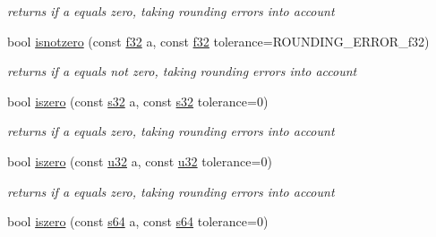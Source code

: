 \begin{DoxyCompactItemize}
\begin{DoxyCompactList}\small\item\em returns if a equals zero, taking rounding errors into account \end{DoxyCompactList}\item 
bool \hyperlink{namespaceirr_1_1core_a6e179d6dd92b81607f0539329dc2410a}{isnotzero} (const \hyperlink{namespaceirr_a0277be98d67dc26ff93b1a6a1d086b07}{f32} a, const \hyperlink{namespaceirr_a0277be98d67dc26ff93b1a6a1d086b07}{f32} tolerance=R\+O\+U\+N\+D\+I\+N\+G\+\_\+\+E\+R\+R\+O\+R\+\_\+f32)\hypertarget{namespaceirr_1_1core_a6e179d6dd92b81607f0539329dc2410a}{}\label{namespaceirr_1_1core_a6e179d6dd92b81607f0539329dc2410a}

\begin{DoxyCompactList}\small\item\em returns if a equals not zero, taking rounding errors into account \end{DoxyCompactList}\item 
bool \hyperlink{namespaceirr_1_1core_a3842b13dc7bd40f068cc8f7fd91bcfa5}{iszero} (const \hyperlink{namespaceirr_ac66849b7a6ed16e30ebede579f9b47c6}{s32} a, const \hyperlink{namespaceirr_ac66849b7a6ed16e30ebede579f9b47c6}{s32} tolerance=0)\hypertarget{namespaceirr_1_1core_a3842b13dc7bd40f068cc8f7fd91bcfa5}{}\label{namespaceirr_1_1core_a3842b13dc7bd40f068cc8f7fd91bcfa5}

\begin{DoxyCompactList}\small\item\em returns if a equals zero, taking rounding errors into account \end{DoxyCompactList}\item 
bool \hyperlink{namespaceirr_1_1core_afa64d4495f986ec0fa840e61cba45c68}{iszero} (const \hyperlink{namespaceirr_a0416a53257075833e7002efd0a18e804}{u32} a, const \hyperlink{namespaceirr_a0416a53257075833e7002efd0a18e804}{u32} tolerance=0)\hypertarget{namespaceirr_1_1core_afa64d4495f986ec0fa840e61cba45c68}{}\label{namespaceirr_1_1core_afa64d4495f986ec0fa840e61cba45c68}

\begin{DoxyCompactList}\small\item\em returns if a equals zero, taking rounding errors into account \end{DoxyCompactList}\item 
bool \hyperlink{namespaceirr_1_1core_a418bebacbef432fcf909e8f3d9b8368d}{iszero} (const \hyperlink{namespaceirr_abf54bd535f8d4dd996270e68c3ad8c08}{s64} a, const \hyperlink{namespaceirr_abf54bd535f8d4dd996270e68c3ad8c08}{s64} tolerance=0)\hypertarget{namespaceirr_1_1core_a418bebacbef432fcf909e8f3d9b8368d}{}\label{namespaceirr_1_1core_a418bebacbef432fcf909e8f3d9b8368d}


\end{DoxyCompactItemize}
